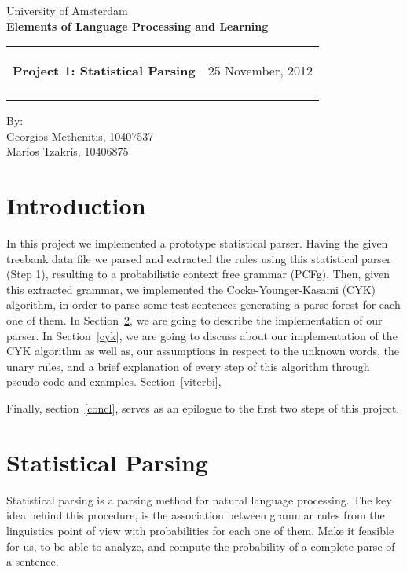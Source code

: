 \documentclass[a4paper,11pt]{article}
\makeatletter
\newcommand{\resheading}[1]{{\large \colorbox{mygrey}{\begin{minipage}{\textwidth}{\textbf{#1 \vphantom{p\^{E}}}}\end{minipage}}}}
\newcommand{\mywebheader}{
  \begin{tabular}{@{}p{5in}p{4in}}
  {\resheading{Project 1: Statistical Parsing}} & {\Large 25 November, 2012}\\\vspace{0.2cm}
  \end{tabular}}
\makeatother
\begin{document}
\begin{center}
{\Large University of Amsterdam}\\ \vspace{0.1cm}
{\LARGE \textbf{Elements of Language Processing and Learning}}\\ [1em]
\end{center}
\mywebheader

\begin{center}
{\Large By:} \\ \vspace{0.2cm}
{\Large Georgios Methenitis, 10407537} \\ \vspace{0.1cm}
{\Large Marios Tzakris, 10406875}\\
\end{center}






\section{Introduction}
In this project we implemented a prototype statistical parser. Having the given treebank data file we parsed and extracted the rules using this statistical parser (Step 1), resulting to a probabilistic context free grammar (PCFg). Then, given this extracted grammar, we implemented the Cocke-Younger-Kasami (CYK) algorithm, in order to parse some test sentences generating a parse-forest for each one of them. In Section~\ref{parser}, we are going to describe the implementation of our parser. In Section~\ref{cyk}, we are going to discuss about our implementation of the CYK algorithm as well as, our assumptions in respect to the unknown words, the unary rules, and a brief explanation of every step of this algorithm through pseudo-code and examples. 
Section~\ref{viterbi},


Finally, section~\ref{concl}, serves as an epilogue to the first two steps of this project.





\section{Statistical Parsing}
\label{parser}
Statistical parsing is a parsing method for natural language processing. The key idea behind this procedure, is the association between grammar rules from the linguistics point of view with probabilities for each one of them. Make it feasible for us, to be able to analyze, and compute the probability of a complete parse of a sentence. 
\end{document}
